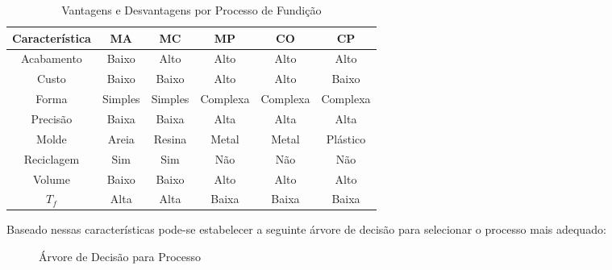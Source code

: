 \documentclass{article}
\begin{document}
                \begin{table}[H]
                    \centering
                    \begin{tabular}[]{c | c c c c c}\hline
                        Característica & MA      & MC      & MP       & CO       & CP\\\hline
                        Acabamento     & Baixo   & Alto    & Alto     & Alto     & Alto\\
                        Custo          & Baixo   & Baixo   & Alto     & Alto     & Baixo\\
                        Forma          & Simples & Simples & Complexa & Complexa & Complexa\\
                        Precisão       & Baixa   & Baixa   & Alta     & Alta     & Alta\\
                        Molde          & Areia   & Resina  & Metal    & Metal    & Plástico\\
                        Reciclagem     & Sim     & Sim     & Não      & Não      & Não\\
                        Volume         & Baixo   & Baixo   & Alto     & Alto     & Alto\\\hline
                        $T_{f}$        & Alta    & Alta    & Baixa    & Baixa    & Baixa\\\hline
                    \end{tabular}
                    \caption{Vantagens e Desvantagens por Processo de Fundição}
                \end{table}\noindent
            Baseado nessas características pode-se estabelecer a seguinte árvore de decisão para selecionar o processo mais adequado:
                \begin{figure}[H]
                    \centering
                    \caption{Árvore de Decisão para Processo}
                \end{figure}
\end{document}
